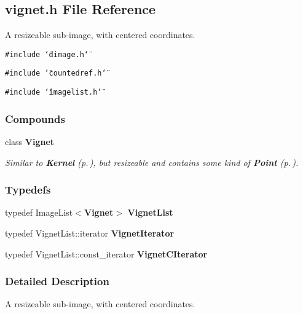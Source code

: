 \subsection{vignet.h File Reference}
\label{vignet_h}
A resizeable sub-image, with centered coordinates. 


{\tt \#include \char`\"{}dimage.h\char`\"{}}\par
{\tt \#include \char`\"{}countedref.h\char`\"{}}\par
{\tt \#include \char`\"{}imagelist.h\char`\"{}}\par
\subsubsection*{Compounds}
\begin{CompactItemize}
\item 
class {\bf Vignet}
\begin{CompactList}\small\item\em Similar to {\bf Kernel} {\rm (p.\,\pageref{class_kernel})}, but resizeable and contains some kind of {\bf Point} {\rm (p.\,\pageref{class_point})}.\item\end{CompactList}\end{CompactItemize}
\subsubsection*{Typedefs}
\begin{CompactItemize}
\item 
{}
typedef Image\-List$<${\bf Vignet}$>$ {\bf Vignet\-List}\label{vignet_h_a0}

\item 
{}
typedef Vignet\-List::iterator {\bf Vignet\-Iterator}\label{vignet_h_a1}

\item 
{}
typedef Vignet\-List::const\_\-iterator {\bf Vignet\-CIterator}\label{vignet_h_a2}

\end{CompactItemize}


\subsubsection{Detailed Description}
A resizeable sub-image, with centered coordinates.



